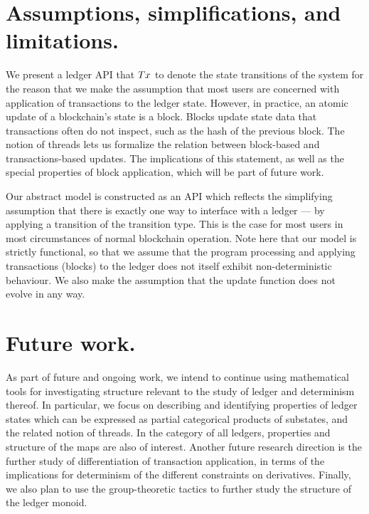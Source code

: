 \section{Assumptions, simplifications, and limitations. }
We present a ledger API that $\Tx$ to denote the state transitions
of the system for the reason that we make the assumption that most users are concerned with
application of transactions to the ledger state. However, in practice,
an atomic update of a blockchain's state is a block. Blocks update state data
that transactions often do not inspect, such as the hash of the previous block.
The notion of threads lets us formalize the relation between
block-based and transactions-based updates. The implications of this statement,
as well as the special properties of block application, which will be part of future work.

Our abstract model is constructed as an API which reflects the simplifying
assumption that there is exactly one way to interface with a ledger --- by applying
a transition of the transition type. This is the case for most users in most circumstances of normal
blockchain operation. Note here that our model is strictly functional, so that we
assume that the program processing
and applying transactions (blocks) to the ledger does not itself
exhibit non-deterministic behaviour. We also make the assumption that the update function
does not evolve in any way.

\section{Future work. }
As part of future and ongoing work, we intend to continue using mathematical
tools for investigating structure relevant to the study of
ledger and determinism thereof. In particular,
we focus on describing and identifying properties of ledger states
which can be expressed as partial categorical products of substates, and the related
notion of threads. In the category of all ledgers, properties
and structure of the maps are also of interest.
Another future research direction is the further study of differentiation
of transaction application, in terms of the implications for determinism of the different
constraints on derivatives. Finally, we also plan to use the group-theoretic
tactics to further study the structure of the ledger monoid.
